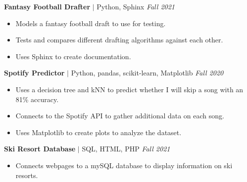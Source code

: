 \documentclass[11pt, a4paper, roman]{moderncv}
\newcommand{\project}[5]{
	\textbf{#1}
	$|$ #3 
	\hfill\textit{#4}
	#5
	\vspace{2mm}
}
\begin{document}
{\project{Fantasy Football Drafter}{https://github.com/GoneSahlin/fantasydraft}{Python, Sphinx}{Fall 2021}
	{\begin{itemize}
		\item Models a fantasy football draft to use for testing.
		\item Tests and compares different drafting algorithms against each other.
		\item Uses Sphinx to create documentation.
	\end{itemize}}
}
{\project{Spotify Predictor}{https://github.com/GoneSahlin/CPSC222Final}{Python, pandas, scikit-learn, Matplotlib}{Fall 2020}
	{\begin{itemize}
    		\item Uses a decision tree and kNN to predict whether I will skip a song with an 81\% accuracy.
    		\item Connects to the Spotify API to gather additional data on each song.
   		 \item Uses Matplotlib to create plots to analyze the dataset.
	\end{itemize}}
}
{\project{Ski Resort Database}{https://github.com/GoneSahlin/321_Final_Project}{SQL, HTML, PHP}{Fall 2021}
	{\begin{itemize}
    		\item Connects webpages to a mySQL database to display information on ski resorts.
	\end{itemize}}
}
\end{document}
